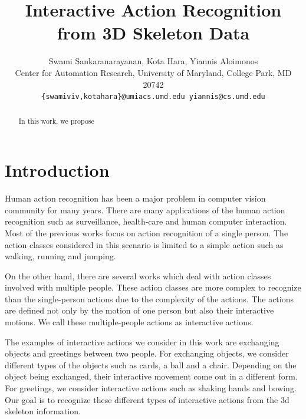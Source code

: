 \documentclass[10pt,twocolumn,letterpaper]{article}
\begin{document}
\title{Interactive Action Recognition from 3D Skeleton Data}

\author{Swami Sankaranarayanan, Kota Hara, Yiannis Aloimonos\\
Center for Automation Research, University of Maryland, College Park, MD 20742\\
{\tt\small \{swamiviv,kotahara\}@umiacs.umd.edu yiannis@cs.umd.edu}
}


\maketitle

\begin{abstract}
In this work, we propose
   
\end{abstract}

\section{Introduction}
Human action recognition has been a major problem in computer vision community for many years. There are many applications of the human action recognition such as surveillance, health-care and human computer interaction. Most of the previous works focus on action recognition of a single person. The action classes considered in this scenario is limited to a simple action such as walking, running and jumping. 

On the other hand, there are several works which deal with action classes involved with multiple people. These action classes are more complex to recognize than the single-person actions due to the complexity of the actions. The actions are defined not only by the motion of one person but also their interactive motions. We call these multiple-people actions as interactive actions.

The examples of interactive actions we consider in this work are exchanging objects and greetings between two people. For exchanging objects, we consider different types of the objects such as cards, a ball and a chair. Depending on the object being exchanged, their interactive movement come out in a different form. For greetings, we consider interactive actions such as shaking hands and bowing. Our goal is to recognize these different types of interactive actions from the 3d skeleton information.
\end{document}
